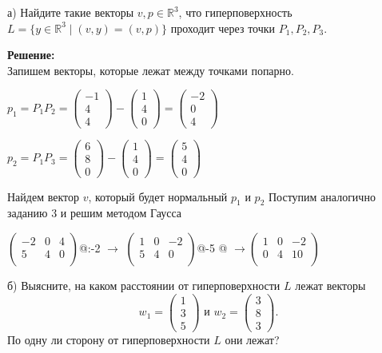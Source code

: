 \documentclass[a4paper,12pt]{article}
\makeatletter
\newcommand*{\rom}[1]{\expandafter\@slowromancap\romannumeral #1@}
\makeatother
\begin{document}
\begin{enumerate}
а) Найдите такие векторы $v, p\in \mathbb R^3$, что гиперповерхность $L = \{y\in \mathbb R^3 \mid (v, y) = (v, p)\}$ проходит через точки $P_1, P_2, P_3$.

\textbf{Решение:}\\
Запишем векторы, которые лежат между точками попарно.

$p_1= P_1P_2 = 
\begin{pmatrix}
{-1}\\{4}\\{4}
\end{pmatrix}-\begin{pmatrix}
{1}\\{4}\\{0}
\end{pmatrix}=\begin{pmatrix}
{-2}\\{0}\\{4}
\end{pmatrix}$

$p_2= P_1P_3 = 
\begin{pmatrix}
{6}\\{8}\\{0}
\end{pmatrix}-\begin{pmatrix}
{1}\\{4}\\{0}
\end{pmatrix}=\begin{pmatrix}
{5}\\{4}\\{0}
\end{pmatrix}$

Найдем вектор $v$, который будет нормальный $p_1$ и $p_2$
Поступим аналогично заданию 3 и решим методом Гаусса

$\begin{pmatrix}
-2&0&4\\
5&4&0\\
\end{pmatrix}$\rom{1}:-2 $\rightarrow$
$\begin{pmatrix}
1&0&-2\\
5&4&0\\
\end{pmatrix}$\rom{2}-5 \rom{2} $\rightarrow$$\begin{pmatrix}
1&0&-2\\
0&4&10\\
\end{pmatrix}$


б) Выясните, на каком расстоянии от гиперповерхности $L$ лежат векторы
\[
w_1 =
\begin{pmatrix}
{1}\\{3}\\{5}
\end{pmatrix}
\text{ и \ }
w_2 = 
\begin{pmatrix}
{3}\\{8}\\{3}
\end{pmatrix}.
\]
По одну ли сторону от гиперповерхности $L$ они лежат?


\end{enumerate}
\end{document}
